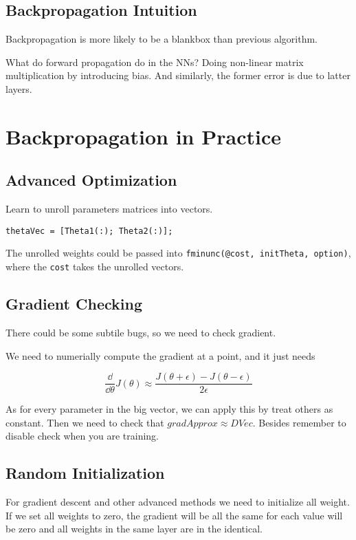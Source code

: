 \documentclass[en,11pt,english,black,simple]{../elegantbook}
\begin{document}
\subsection{Backpropagation Intuition}

Backpropagation is more likely to be a blankbox than previous algorithm.  

What do forward propagation do in the NNs? Doing non-linear matrix multiplication by introducing bias. And similarly, the former error is due to latter layers. 

\section{Backpropagation in Practice}

\subsection{Advanced Optimization}

Learn to unroll parameters matrices into vectors. 

\begin{lstlisting}
thetaVec = [Theta1(:); Theta2(:)];
\end{lstlisting}

The unrolled weights could be passed into \lstinline{fminunc(@cost, initTheta, option)}, where the \lstinline{cost} takes the unrolled vectors.

\subsection{Gradient Checking}

There could be some subtile bugs, so we need to check gradient.

We need to numerially compute the  gradient at a point, and it just needs 

\[\frac{\dd{}}{\dd{\theta}}J(\theta) \approx \frac{J(\theta + \epsilon) - J(\theta - \epsilon)}{2 \epsilon}\]

As for every parameter in the big vector, we can apply this by treat others as constant. Then we need to check that \(gradApprox \approx DVec\). Besides remember to disable check when you are training. 

\subsection{Random Initialization}

For gradient descent and other advanced methods we need to initialize all weight. If we set all weights to zero, the gradient will be all the same for each value will be zero and all weights in the same layer are in the identical.
\end{document}
